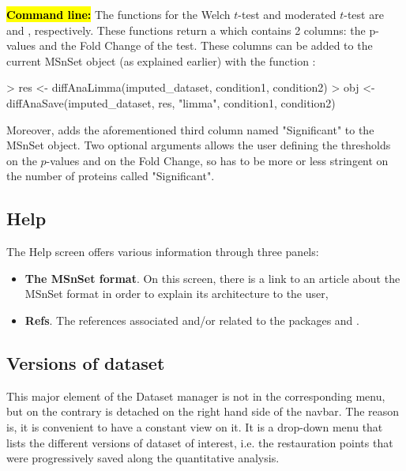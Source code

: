 \documentclass[12pt]{article}
\begin{document}
\hl{\bf Command line:} The  functions for the Welch $t$-test and moderated $t$-test are  and , respectively. These functions return a  which contains 2 columns: the p-values and the Fold Change of the test. These columns can be added to the current MSnSet object  (as explained earlier) with the function :
\begin{Schunk}
\begin{Sinput}
> res <- diffAnaLimma(imputed_dataset, condition1, condition2)
> obj <- diffAnaSave(imputed_dataset, res, "limma", condition1, condition2)
\end{Sinput}
\end{Schunk}
Moreover,  adds the aforementioned third column named "Significant" to the MSnSet object. Two optional arguments allows the user defining the thresholds on the $p$-values and on the Fold Change, so has to be more or less stringent on the number of proteins called "Significant".





\subsection{Help}
The Help screen offers various information through three panels:
\begin{itemize}
\item\textbf{{The MSnSet format}}. On this screen, there is a link to an article about the MSnSet format in order to explain its architecture to the user,
\item\textbf{{Refs}}. The references associated and/or related to the packages  and .
\end{itemize}


\subsection{Versions of dataset}\label{sec:availabledatasets}
This major element of the Dataset manager is not in the corresponding menu, but on the contrary is detached on the right hand side of the navbar. The reason is,  it is convenient to have a constant view on it. It is a  drop-down menu that lists the different versions of dataset of interest, i.e. the restauration points that were progressively saved along the quantitative analysis. 
\end{document}
